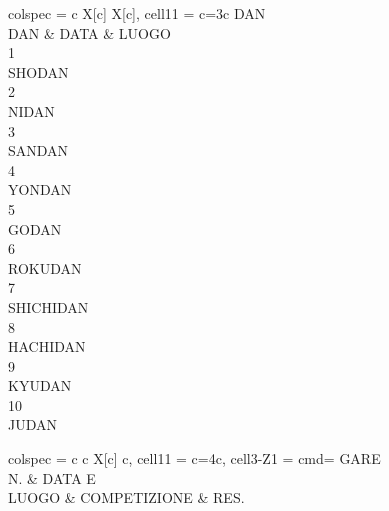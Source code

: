 \documentclass[
    twoside,
    10pt
]{book}
\begin{document}
    \newpage
    \begin{hhtable}{
        colspec = {c X[c] X[c]},
        cell{1}{1} = {c=3}{c}
    }
        DAN \\
        DAN & DATA & LUOGO \\
        {1\textdegree\\SHODAN} \\
        {2\textdegree\\NIDAN} \\
        {3\textdegree\\SANDAN} \\
        {4\textdegree\\YONDAN} \\
        {5\textdegree\\GODAN} \\
        {6\textdegree\\ROKUDAN} \\
        {7\textdegree\\SHICHIDAN} \\
        {8\textdegree\\HACHIDAN} \\
        {9\textdegree\\KYUDAN} \\
        {10\textdegree\\JUDAN} \\
    \end{hhtable}

    \newcommand{\competitions}[1]{
        \begin{hhtable}{
            colspec = {c c X[c] c},
            cell{1}{1} = {c=4}{c},
            cell{3-Z}{1} = {cmd=\inteval{\value{rownum}-2+#1}}
        }
            GARE \\
            N. & {DATA E\\\;\;LUOGO\;\;} & COMPETIZIONE & RES. \\ \\ \\ \\ \\ \\ \\ \\ \\ \\ \\
        \end{hhtable}
    }

    \newpage
    \competitions{0}
\end{document}
